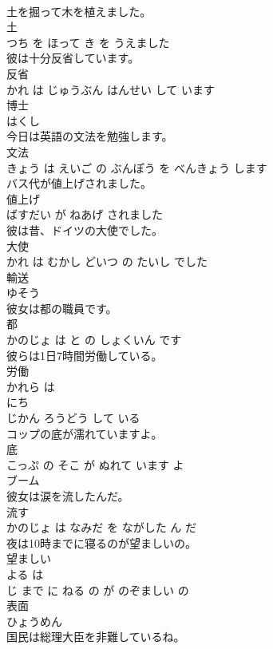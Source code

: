 \documentclass[8pt]{extreport}
\begin{document}
\begin{CJK}{UTF8}{min}
\\	土を掘って木を植えました。	
\\	土 
\\	つち を ほって き を うえました			
\\	彼は十分反省しています。	
\\	反省 
\\	かれ は じゅうぶん はんせい して います			
\\	博士	
\\	はくし			
\\	今日は英語の文法を勉強します。	
\\	文法 
\\	きょう は えいご の ぶんぽう を べんきょう します			
\\	バス代が値上げされました。	
\\	値上げ 
\\	ばすだい が ねあげ されました			
\\	彼は昔、ドイツの大使でした。	
\\	大使 
\\	かれ は むかし どいつ の たいし でした			
\\	輸送	
\\	ゆそう			
\\	彼女は都の職員です。	
\\	都 
\\	かのじょ は と の しょくいん です			
\\	彼らは1日7時間労働している。	
\\	労働 
\\	かれら は 
\\	にち 
\\	じかん ろうどう して いる			
\\	コップの底が濡れていますよ。	
\\	底 
\\	こっぷ の そこ が ぬれて います よ			
\\	ブーム	
\\	彼女は涙を流したんだ。	
\\	流す 
\\	かのじょ は なみだ を ながした ん だ			
\\	夜は10時までに寝るのが望ましいの。	
\\	望ましい 
\\	よる は 
\\	じ まで に ねる の が のぞましい の			
\\	表面	
\\	ひょうめん			
\\	国民は総理大臣を非難しているね。	

\end{CJK}
\end{document}
